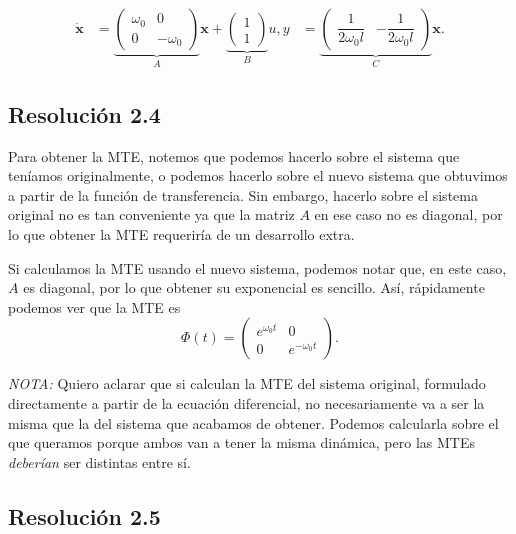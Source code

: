 \documentclass[
  11pt,
  letterpaper,
   addpoints,
  answers
  ]{exam}
\begin{document}
\begin{questions}
\begin{solution}
\begin{align}
\dot{\mathbf{x}}&=
\underbrace{\begin{pmatrix}\omega_0&0\\[2pt]0&-\omega_0\end{pmatrix}}_{A}\mathbf{x}
+\underbrace{\begin{pmatrix}1\\[2pt]1\end{pmatrix}}_{B}u,
y&=\underbrace{\begin{pmatrix}\dfrac{1}{2\omega_0 l}&-\dfrac{1}{2\omega_0 l}\end{pmatrix}}_{C}\mathbf{x}.
\end{align}

\subsection*{Resolución 2.4}

Para obtener la MTE, notemos que podemos hacerlo sobre el sistema que teníamos originalmente, o podemos hacerlo sobre el nuevo sistema que obtuvimos a partir de la función de transferencia. Sin embargo, hacerlo sobre el sistema original no es tan conveniente ya que la matriz $A$ en ese caso no es diagonal, por lo que obtener la MTE requeriría de un desarrollo extra.

Si calculamos la MTE usando el nuevo sistema, podemos notar que, en este caso, $A$ es diagonal, por lo que obtener su exponencial es sencillo. Así, rápidamente podemos ver que la MTE es
\begin{equation}
\Phi(t)=
\begin{pmatrix}
e^{\omega_0 t}&0\\[2pt]
0&e^{-\omega_0 t}
\end{pmatrix}.
\end{equation}

\textit{NOTA:} Quiero aclarar que si calculan la MTE del sistema original, formulado directamente a partir de la ecuación diferencial, no necesariamente va a ser la misma que la del sistema que acabamos de obtener. Podemos calcularla sobre el que queramos porque ambos van a tener la misma dinámica, pero las MTEs \emph{deberían} ser distintas entre sí.

\subsection*{Resolución 2.5}


\end{solution}
\end{questions}
\end{document}
